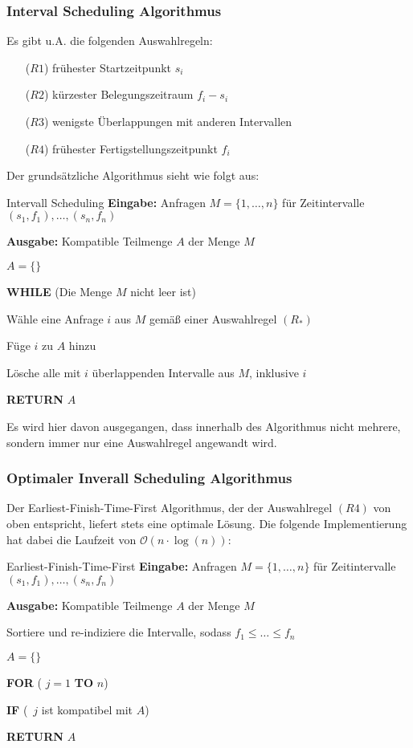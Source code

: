 \documentclass{panikzettel}
\newcommand\tab[1][1cm]{\hspace*{#1}}
\begin{document}
\subsubsection{Interval Scheduling Algorithmus}

Es gibt u.A. die folgenden Auswahlregeln:

\begin{itemize}
	\item[($R1$)] frühester Startzeitpunkt $s_i$
	\item[($R2$)] kürzester Belegungszeitraum $f_i - s_i$
	\item[($R3$)] wenigste Überlappungen mit anderen Intervallen
	\item[($R4$)] frühester Fertigstellungszeitpunkt $f_i$
\end{itemize}

Der grundsätzliche Algorithmus sieht wie folgt aus:

\begin{algo}{Intervall Scheduling}
	\textbf{Eingabe:} Anfragen $M= \{1, \dots , n\}$ für Zeitintervalle $(s_1,f_1), \dots,(s_n,f_n)$
	
	\textbf{Ausgabe:} Kompatible Teilmenge $A$ der Menge $M$
	\tcblower
	
	$A = \{ \}$
	
	\textbf{WHILE} (Die Menge $M$ nicht leer ist)
	
	\tab Wähle eine Anfrage $i$ aus $M$ gemäß einer Auswahlregel $(R_*)$
	
	\tab Füge $i$ zu $A$ hinzu
	
	\tab Lösche alle mit $i$ überlappenden Intervalle aus $M$, inklusive $i$
	
	\textbf{RETURN} $A$
\end{algo}

Es wird hier davon ausgegangen, dass innerhalb des Algorithmus nicht mehrere, sondern immer nur eine Auswahlregel angewandt wird.

\subsubsection{Optimaler Inverall Scheduling Algorithmus}

Der Earliest-Finish-Time-First Algorithmus, der der Auswahlregel $(R4)$ von oben entspricht, liefert stets eine optimale Lösung. Die folgende Implementierung hat dabei die Laufzeit von $\mathcal{O}(n \cdot \log (n))$:

\begin{algo}{Earliest-Finish-Time-First}
	\textbf{Eingabe:} Anfragen $M= \{1, \dots , n\}$ für Zeitintervalle $(s_1,f_1), \dots,(s_n,f_n)$
	
	\textbf{Ausgabe:} Kompatible Teilmenge $A$ der Menge $M$
	\tcblower
	
	Sortiere und re-indiziere die Intervalle, sodass $f_1 \leq \dots \leq f_n$
	
	$A = \{ \}$
	
	\textbf{FOR} ( $j = 1$ \textbf{TO} $n$)
	
	\tab \textbf{IF} (\, $j$ ist kompatibel mit $A$)
	
	\textbf{RETURN} $A$
\end{algo}
\end{document}
